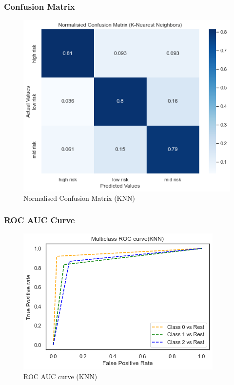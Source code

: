 \documentclass[12pt, letter]{article}
\begin{document}
\subsubsection{Confusion Matrix}
\begin{figure}[h]
    \centering
    \includegraphics[scale = 0.5]{KNN_CM.png}
    \caption{Normalised Confusion Matrix (KNN)}
    \label{RF_CM}
\end{figure}

\subsubsection{ROC AUC Curve}
\begin{figure}[h]
    \centering
    \includegraphics[scale = 0.8]{ROC_KNN.png}
    \caption{ROC AUC curve (KNN)}
    \label{ROC_DT}
\end{figure}

\pagebreak
\end{document}
